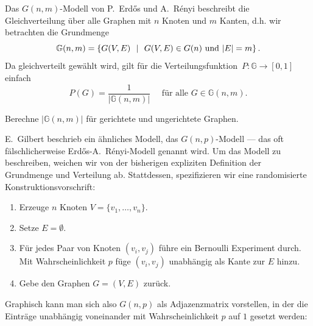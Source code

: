 Das $G(n, m)$-Modell  von P.~Erd\H{o}s und A.~R\'enyi beschreibt die Gleichverteilung über alle Graphen mit $n$ Knoten und $m$ Kanten, d.h. wir betrachten die Grundmenge
\begin{equation}
    \mathbb G(n, m) = \left\{ G(V,E) \ \ \middle|\ \ G(V,E) \in G(n) \text{ und } |E| = m \right\}.
\end{equation}
Da gleichverteilt gewählt wird, gilt für die Verteilungsfunktion~{$P\colon \mathbb G \to [0,1]$} einfach
\begin{equation}
    P(G) = \frac{1}{| \mathbb G(n,m) |} \quad \text{ für alle } G \in \mathbb G(n, m).
\end{equation}

\begin{exercise}
    Berechne $|\mathbb G(n, m)|$ für gerichtete und ungerichtete Graphen.
\end{exercise}

E.~Gilbert  beschrieb ein ähnliches Modell, das $G(n, p)$-Modell --- das oft fälschlicherweise \glqq Erd\H{o}s-A.~R\'enyi-Modell \grqq{} genannt wird.
Um das Modell zu beschreiben, weichen wir von der bisherigen expliziten Definition der Grundmenge und Verteilung ab.
Stattdessen, spezifizieren wir eine randomisierte Konstruktionsvorschrift:
\begin{enumerate}
    \item Erzeuge $n$ Knoten $V = \{v_1, \ldots, v_n\}$.
    \item Setze $E = \emptyset$.
    \item Für jedes Paar von Knoten $(v_i, v_j)$ führe ein Bernoulli Experiment durch.
          Mit Wahrscheinlichkeit $p$ füge $(v_i, v_j)$ unabhängig als Kante zur $E$ hinzu.
    \item Gebe den Graphen $G=(V, E)$ zurück.
\end{enumerate}

\noindent
Graphisch kann man sich also $G(n, p)$ als Adjazenzmatrix vorstellen, in der die Einträge unabhängig voneinander mit Wahrscheinlichkeit $p$ auf $1$ gesetzt werden:

